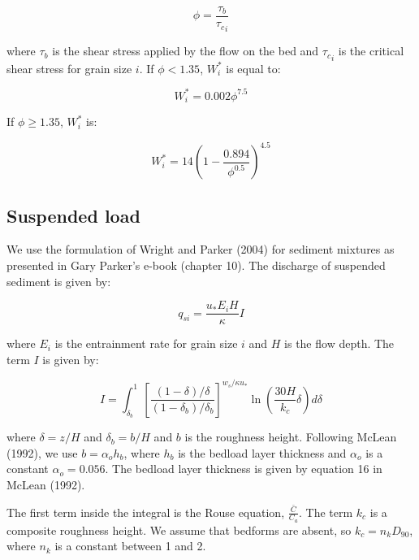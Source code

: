 \documentclass[11pt]{article}
\begin{document}
\begin{equation}
\phi = \frac{\tau_b}{{\tau_c}_i}
\end{equation}

\noindent where $\tau_b$ is the shear stress applied by the flow on the bed and ${\tau_c}_i$ is the critical shear stress for grain size $i$. If $\phi < 1.35$, $W_i^*$ is equal to:

\begin{equation}
W_i^* = 0.002 \phi^7.5
\end{equation}

If $\phi \ge 1.35$, $W_i^*$ is:

\begin{equation}
W_i^* = 14 \left( 1 - \frac{0.894}{\phi^0.5} \right)^4.5
\end{equation}

\subsection{Suspended load}

We use the formulation of Wright and Parker (2004) for sediment mixtures as presented in Gary Parker's e-book (chapter 10). The discharge of suspended sediment is given by:

\begin{equation}
q_{si} = \frac{u_* E_i H}{\kappa} I
\end{equation}

\noindent where $E_i$ is the entrainment rate for grain size $i$ and $H$ is the flow depth. The term $I$ is given by:

\begin{equation}
I = \int_{\delta_b}^{1} {\left[ \frac{(1 - \delta) / \delta}{(1 - \delta_b) / \delta_b} \right] } ^{w_s/\kappa u_*}   \ln \left( \frac{30 H}{k_c} \delta \right) d\delta
\end{equation}

\noindent where $\delta = z / H$ and $\delta_b = b / H$ and $b$ is the roughness height. Following McLean (1992), we use $b = \alpha_o h_b$, where $h_b$ is the bedload layer thickness and $\alpha_o$ is a constant $\alpha_o = 0.056$. The bedload layer thickness is given by equation 16 in McLean (1992).

The first term inside the integral is the Rouse equation, $\frac{\bar{C}}{C_a}$. The term $k_c$ is a composite roughness height. We assume that bedforms are absent, so $k_c = n_k D_{90}$, where $n_k$ is a constant between 1 and 2.
\end{document}
